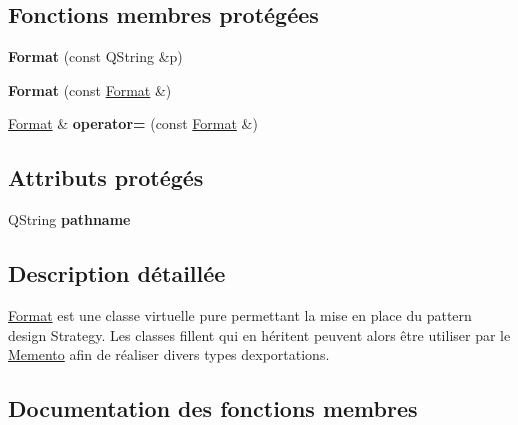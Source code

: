 \subsection*{Fonctions membres protégées}
\begin{DoxyCompactItemize}
\item 
\hypertarget{class_format_ae0a81f45095e58dda33592992dcf0289}{}{\bfseries Format} (const Q\+String \&p)\label{class_format_ae0a81f45095e58dda33592992dcf0289}

\item 
\hypertarget{class_format_ab69111c370cfe44f9508e78e5431cc65}{}{\bfseries Format} (const \hyperlink{class_format}{Format} \&)\label{class_format_ab69111c370cfe44f9508e78e5431cc65}

\item 
\hypertarget{class_format_a7a5276a88c488462eea3a508b71f4d9c}{}\hyperlink{class_format}{Format} \& {\bfseries operator=} (const \hyperlink{class_format}{Format} \&)\label{class_format_a7a5276a88c488462eea3a508b71f4d9c}

\end{DoxyCompactItemize}
\subsection*{Attributs protégés}
\begin{DoxyCompactItemize}
\item 
\hypertarget{class_format_a84b62f9b8ac97061cba153dc339b88d4}{}Q\+String {\bfseries pathname}\label{class_format_a84b62f9b8ac97061cba153dc339b88d4}

\end{DoxyCompactItemize}


\subsection{Description détaillée}
\hyperlink{class_format}{Format} est une classe virtuelle pure permettant la mise en place du pattern design Strategy. Les classes fillent qui en héritent peuvent alors être utiliser par le \hyperlink{class_memento}{Memento} afin de réaliser divers types d\textquotesingle{}exportations. 

\subsection{Documentation des fonctions membres}
\hypertarget{class_format_a8ef3acfd8d6d5be588e31e6a4a1d789b}{}
